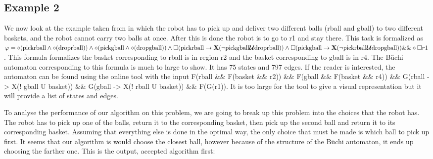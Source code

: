 \subsection{Example 2}
We now look at the example taken from \cite{guo15} in which the robot has to pick up and deliver two different balls (rball and gball) to two different baskets, and the robot cannot carry two balls at once. After this is done the robot is to go to r1 and stay there. This task is formalized as $\varphi = \diamond (\text{pickrball} \wedge \diamond (\text{droprball})) \wedge \diamond(\text{pickgball} \wedge \diamond (\text{dropgball})) \wedge \square (\text{pickrball} \rightarrow \textbf{X}(\neg \text{pickgball} \bm{\mathcal{U}} \text{droprball})) \wedge \square (\text{pickgball} \rightarrow \textbf{X} (\neg \text{pickrball} \bm{\mathcal{U}} \text{dropgball})) \&\& \diamond \square r1$. This formula formalizes the basket corresponding to rball is in region r2 and the basket corresponding to gball is in r4. The B\"uchi automaton corresponding to this formula is much to large to show. It has 75 states and 797 edges. If the reader is interested, the automaton can be found using the online tool \cite{ltlbuchiwebsite} with the input F(rball \&\& F(basket \&\& r2)) \&\& F(gball \&\& F(basket \&\& r4)) \&\& G(rball -> X(! gball U basket)) \&\& G(gball -> X(! rball U basket)) \&\& F(G(r1)). It is too large for the tool to give a visual representation but it will provide a list of states and edges.  

To analyse the performance of our algorithm on this problem, we are going to break up this problem into the choices that the robot has. The robot has to pick up one of the balls, return it to the corresponding basket, then pick up the second ball and return it to its corresponding basket. Assuming that everything else is done in the optimal way, the only choice that must be made is which ball to pick up first. It seems that our algorithm is would choose the closest ball, however because of the structure of the B\"uchi automaton, it ends up choosing the farther one. This is the output, accepted algorithm first:

